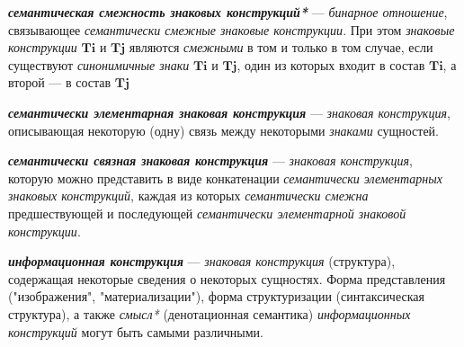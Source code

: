 \textit{\textbf{семантическая смежность знаковых конструкций*}} --- \textit{бинарное отношение}, связывающее \textit{семантически смежные знаковые конструкции}.
При этом \textit{знаковые конструкции} \textit{$\bm{Ti}$} и \textit{$\bm{Tj}$} являются \textit{смежными} в том и только в том случае, если существуют \textit{синонимичные знаки} \textit{$\bm{Ti}$} и \textit{$\bm{Tj}$}, один из которых входит в состав \textit{$\bm{Ti}$}, а второй --- в состав \textit{$\bm{Tj}$}

\begin{SCn}


\end{SCn}

\textit{\textbf{семантически элементарная знаковая конструкция}} --- \textit{знаковая конструкция}, описывающая некоторую (одну) связь между некоторыми \textit{знаками} сущностей.

\textit{\textbf{семантически связная знаковая конструкция}} --- \textit{знаковая конструкция}, которую можно представить в виде конкатенации \textit{семантически элементарных знаковых конструкций}, каждая из которых \textit{семантически смежна} предшествующей и последующей \textit{семантически элементарной знаковой конструкции}.

\begin{SCn}

    \begin{scnindent}
    \end{scnindent}
    \begin{scnindent}
    \end{scnindent}

\end{SCn}

\textit{\textbf{информационная конструкция}} --- \textit{знаковая конструкция} (структура), содержащая некоторые сведения о некоторых сущностях.
Форма представления ("изображения"{}, "материализации"{}), форма структуризации (синтаксическая структура), а также \textit{смысл*} (денотационная семантика) \textit{\textit{информационных конструкций}} могут быть самыми различными.

